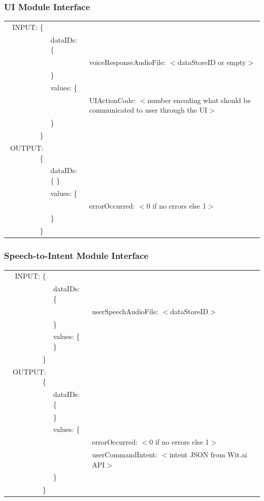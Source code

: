 \documentclass[onecolumn, draftclsnofoot,10pt, compsoc]{IEEEtran}
\begin{document}
        \subsubsection{UI Module Interface}
            \begin{tabular}[t]{r l p{4.5in}}
                INPUT: \{ & & \\
                & dataIDs: \{ & \\
                & & voiceResponseAudioFile: $<$dataStoreID or empty$>$ \\
                & \} & \\
                & values: \{ & \\
                & & UIActionCode: $<$number encoding what should be communicated to user through the UI$>$ \\
                & \} & \\
                \} & & \\
                OUTPUT: \{ & & \\
                & dataIDs: \{ \} & \\
                & values: \{ & \\
                & & errorOccurred: $<$0 if no errors else 1$>$ \\
                & \} & \\
                \} & & \\
            \end{tabular}

        \subsubsection{Speech-to-Intent Module Interface}
            \begin{tabular}[t]{r l p{4.5in}}
                INPUT: \{ & & \\
                & dataIDs: \{ & \\
                & & userSpeechAudioFile: $<$dataStoreID$>$ \\
                & \} & \\
                & values: \{ \} & \\
                \} & & \\
                OUTPUT: \{ & & \\
                & dataIDs: \{ & \\
                & \} & \\
                & values: \{ & \\
                & & errorOccurred: $<$0 if no errors else 1$>$ \\
                & & userCommandIntent: $<$intent JSON from Wit.ai API$>$ \\
                & \} & \\
                \} & & \\
            \end{tabular}
\end{document}
